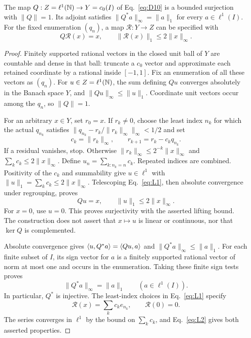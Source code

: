 \begin{lemma}
\label{lem:specified-quotient}
The map $Q:Z=\ell^1(\mathbb N)\to Y=c_0(I)$ of Eq.~\eqref{eq:D10} is a
bounded surjection with $\|Q\|=1$. Its adjoint satisfies
$\|Q^*a\|_\infty=\|a\|_1$ for every $a\in\ell^1(I)$.
For the fixed enumeration $(q_n)$, a map $\mathcal R:Y\to Z$ can be
specified with
\[
Q\mathcal R(x)=x,\qquad \|\mathcal R(x)\|_1\le2\|x\|_\infty.
\]
\end{lemma}
\begin{proof}
\label{sec:L1}
Finitely supported rational vectors in the closed unit ball of $Y$ are
countable and dense in that ball: truncate a $c_0$ vector and approximate
each retained coordinate by a rational inside $[-1,1]$. Fix an enumeration
of all these vectors as $(q_n)$. For $u\in Z=\ell^1(\mathbb N)$, the sum defining
$Qu$ converges absolutely in the Banach space $Y$, and
$\|Qu\|_\infty\le\|u\|_1$. Coordinate unit vectors occur among the $q_n$,
so $\|Q\|=1$.

For an arbitrary $x\in Y$, set $r_0=x$. If $r_k\ne0$, choose the least index $n_k$ for which the actual
$q_{n_k}$ satisfies $\|q_{n_k}-r_k/\|r_k\|_\infty\|_\infty<1/2$ and set
\begin{equation}
c_k=\|r_k\|_\infty,\qquad r_{k+1}=r_k-c_kq_{n_k}.
\tag{L1}\label{eq:L1}
\end{equation}
If a residual vanishes, stop. Otherwise
$\|r_k\|_\infty\le2^{-k}\|x\|_\infty$ and $\sum_k c_k\le2\|x\|_\infty$.
Define $u_n=\sum_{k:n_k=n}c_k$. Repeated indices are combined.
Positivity of the $c_k$ and summability give $u\in\ell^1$ with
$\|u\|_1=\sum_k c_k\le2\|x\|_\infty$.
Telescoping Eq.~\eqref{eq:L1}, then absolute convergence under regrouping,
proves
\begin{equation}
Qu=x,\qquad \|u\|_1\le2\|x\|_\infty.
\tag{L2}\label{eq:L2}
\end{equation}
For $x=0$, use $u=0$. This proves surjectivity with the asserted lifting
bound. The construction does not assert that $x\mapsto u$ is linear or
continuous, nor that $\ker Q$ is complemented.

\label{sec:L2}
Absolute convergence gives $\langle u,Q^*a\rangle=\langle Qu,a\rangle$ and
$\|Q^*a\|_\infty\le\|a\|_1$. For each finite subset of $I$, its sign
vector for $a$ is a finitely supported rational vector of norm at most
one and occurs in the enumeration. Taking these finite sign tests proves
\begin{equation}
\|Q^*a\|_\infty=\|a\|_1\qquad(a\in\ell^1(I)).
\tag{L3}\label{eq:L3}
\end{equation}
In particular, $Q^*$ is injective. The least-index choices in
Eq.~\eqref{eq:L1} specify
\[
\mathcal R(x)=\sum_k c_k e_{n_k},\qquad \mathcal R(0)=0.
\]
The series converges in $\ell^1$ by the bound on $\sum_k c_k$,
and Eq.~\eqref{eq:L2} gives both asserted properties.
\end{proof}

